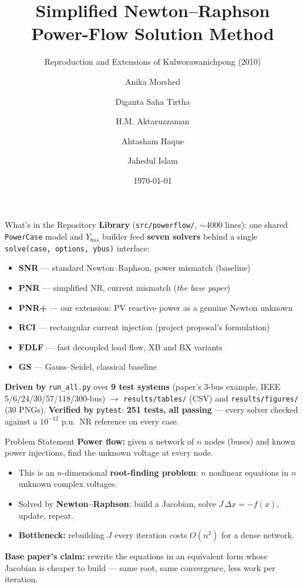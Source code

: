 \documentclass[aspectratio=169,10pt]{beamer}
\title[Simplified NR Power Flow]{Simplified Newton--Raphson Power-Flow Solution Method}
\subtitle{Reproduction and Extensions of Kulworawanichpong (2010)}
\author{Anika Morshed \and Diganta Saha Tirtha \and H.M. Aktaruzzaman \and Ahtasham Haque \and Jahedul Islam}
\institute{CSE402: Numerical Analysis, Simulation and Modeling Sessional}
\date{\today}
\begin{document}
\begin{frame}
  \titlepage
\end{frame}

\begin{frame}{What's in the Repository}
  \small
  \textbf{Library} (\texttt{src/powerflow/}, $\sim$4000 lines): one shared
  \texttt{PowerCase} model and $Y_{bus}$ builder feed \textbf{seven solvers}
  behind a single \texttt{solve(case, options, ybus)} interface:
  \begin{itemize}
    \item \textbf{SNR} --- standard Newton--Raphson, power mismatch (baseline)
    \item \textbf{PNR} --- simplified NR, current mismatch (\emph{the base paper})
    \item \textbf{PNR+} --- our extension: PV reactive power as a genuine Newton unknown
    \item \textbf{RCI} --- rectangular current injection (project proposal's formulation)
    \item \textbf{FDLF} --- fast decoupled load flow, XB and BX variants
    \item \textbf{GS} --- Gauss--Seidel, classical baseline
  \end{itemize}
  \textbf{Driven by} \texttt{run\_all.py} over \textbf{9 test systems}
  (paper's 3-bus example, IEEE 5/6/24/30/57/118/300-bus) $\to$
  \texttt{results/tables/} (CSV) and \texttt{results/figures/} (30 PNGs).
  \textbf{Verified by} \texttt{pytest}: \textbf{251 tests, all passing} ---
  every solver checked against a $10^{-12}$ p.u.\ NR reference on every case.
\end{frame}

\begin{frame}{Problem Statement}
  \small
  \textbf{Power flow:} given a network of $n$ nodes (buses) and known power
  injections, find the unknown voltage at every node.

  \medskip
  \begin{itemize}
    \item This is an $n$-dimensional \textbf{root-finding problem}: $n$
      nonlinear equations in $n$ unknown complex voltages.
    \item Solved by \textbf{Newton--Raphson}: build a Jacobian, solve
      $J\,\Delta x = -f(x)$, update, repeat.
    \item \textbf{Bottleneck:} rebuilding $J$ every iteration costs
      $O(n^2)$ for a dense network.
  \end{itemize}

  \medskip
  \textbf{Base paper's claim:} rewrite the equations in an equivalent form
  whose Jacobian is cheaper to build --- same root, same convergence,
  less work per iteration.
\end{frame}
\end{document}
